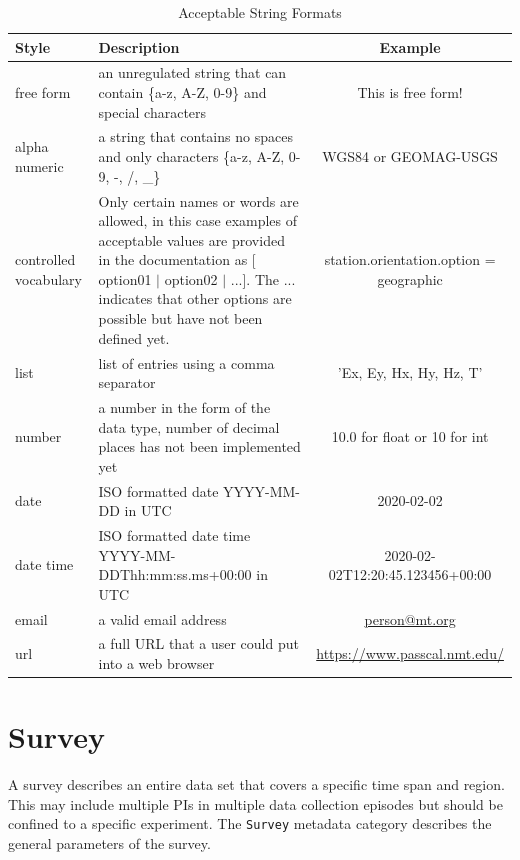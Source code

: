 \documentclass{article}
\begin{document}
\begin{table}[htb!]
	\centering
	\caption[Acceptable String Formats]{Acceptable String Formats}
	\begin{tabular}{|l|p{}|c|}
		\hline
		\textbf{Style} & \textbf{Description}  & \textbf{Example} \\ \hline
		free form & an unregulated string that can contain \{a-z, A-Z, 0-9\} and special characters & This is free form! \\ \hline
		
		alpha numeric & a string that contains no spaces and only characters \{a-z, A-Z, 0-9, -, /, \_\} & WGS84 or GEOMAG-USGS \\ \hline
		controlled vocabulary & Only certain names or words are allowed, in this case examples of acceptable values are provided in the documentation as [ option01 $|$ option02 $|$ ...]. The ... indicates that other options are possible but have not been defined yet. &  station.orientation.option = geographic \\ \hline
		list & list of entries using a comma separator & 'Ex, Ey, Hx, Hy, Hz, T' \\ \hline
		number & a number in the form of the data type, number of decimal places has not been implemented yet & 10.0 for float or 10 for int \\ \hline
		date & ISO formatted date YYYY-MM-DD in UTC & 2020-02-02 \\ \hline
		date time & ISO formatted date time YYYY-MM-DDThh:mm:ss.ms+00:00 in UTC & 2020-02-02T12:20:45.123456+00:00 \\ \hline
		email & a valid email address & \url{person@mt.org} \\ \hline
		url & a full URL that a user could put into a web browser  &  \url{https://www.passcal.nmt.edu/} \\ \hline
		
		
	\end{tabular}
	\label{tab:values}
\end{table}

\clearpage
\newpage
\section{Survey}

A survey describes an entire data set that covers a specific time span and region. This may include multiple PIs in multiple data collection episodes but should be confined to a specific experiment. The \verb|Survey| metadata category describes the general parameters of the survey.
\end{document}
